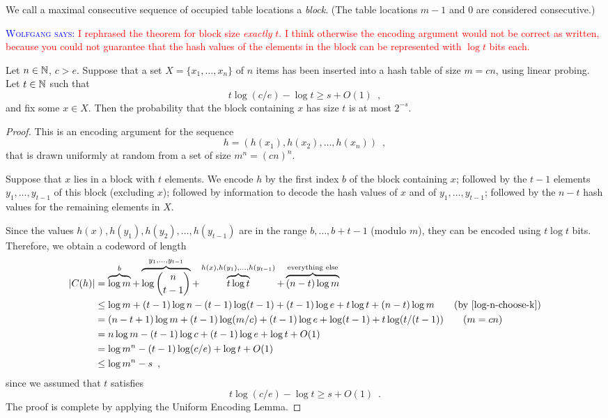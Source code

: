 \documentclass{patmorin}
\newcommand{\aremark}[3]{\textcolor{blue}{\textsc{#1 #2:}}
  \textcolor{red}{\textsf{#3}}}
\newcommand{\wolfgang}[2][says]{\aremark{Wolfgang}{#1}{#2}}
\begin{document}
We call a maximal consecutive sequence of occupied table locations a
\emph{block}. (The table locations $m-1$ and $0$ are considered
consecutive.)

\wolfgang{I rephrased the theorem for block size \emph{exactly}
$t$. I think otherwise the encoding argument would not be correct
as written,
because you could not guarantee that the hash values of the elements
in the block can be represented with $\log t$ bits each.}
\begin{thm}
  Let $n \in \mathbb{N}$, $c > e$.
  Suppose that a set $X = \{x_1, \dots, x_n\}$ of $n$ items 
  has been inserted into a hash table of size $m = cn$, using linear 
  probing.
  Let $t \in \mathbb{N}$ such that
  \[
    t \log (c/e) - \log t \ge s + O(1) \enspace ,
  \]
  and fix some $x\in X$. 
  Then the probability that the block containing
  $x$ has size $t$
  is at most $2^{-s}$.
\end{thm}

\begin{proof}
  This is an encoding argument for 
  the sequence
  \[
    h = (h(x_1),h(x_2),\ldots,h(x_n)) \enspace ,
  \]
  that is drawn uniformly at random from a set of size
  $m^n = (cn)^n$.
  
  Suppose that $x$ lies in a block with $t$ elements.
  We encode $h$ by the first index $b$ of the block containing $x$;
  followed by the $t-1$ elements $y_1,\dots,y_{t-1}$ of this block
  (excluding $x$); followed by information to decode the hash
  values of $x$ and of $y_1,\dots,y_{t-1}$; followed by
  the $n-t$ hash values for the remaining elements in $X$.

  Since the values $h(x),h(y_1),h(y_2),\ldots,h(y_{t-1})$ are in the range
  $b,\ldots,b+t-1$ (modulo $m$), they can be encoded using
  $t\log t$ bits.  Therefore, 
  we obtain a codeword of length 
  \begin{align*}
    |C(h)| & = \overbrace{\log m}^{b} + \overbrace{\log\binom{n}{t-1}}^{y_1,\ldots,y_{t-1}} + \overbrace{t\log t}^{h(x),h(y_1),\ldots,h(y_{t-1})} + \overbrace{(n-t)\log m}^{\text{everything else}} \\
           & \le \log m + (t-1)\log n - 
             (t-1)\log(t-1) + (t-1)\log e + t\log t + (n-t)\log m \tag{by \eqref{log-n-choose-k}}\\
	  &=
         (n-t+1)\log m + (t-1)\log (m/c) + (t-1)\log e + \log (t-1)+ t\log(t/(t-1)) \tag{$m = cn$}\\
           & = n\log m - (t-1)\log c + (t-1)\log e + \log t + O(1) \\
           & = \log m^n - (t-1)\log(c/e) + \log t + O(1) \\
           & \le \log m^n - s \enspace ,
  \end{align*}
  since we assumed that $t$ satisfies
  \[
    t \log (c/e) - \log t \ge s + O(1) \enspace .
  \]
  The proof is complete by applying the Uniform Encoding Lemma.
\end{proof}
\end{document}
